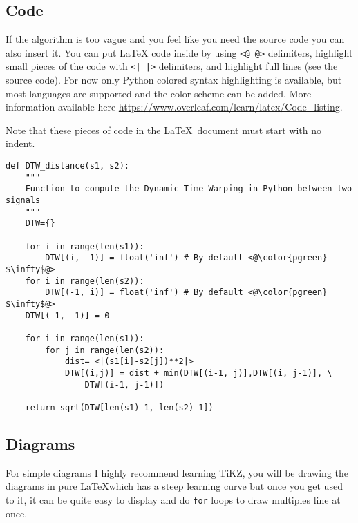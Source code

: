 \documentclass{project-logbook}
\begin{document}
	\subsection{Code} \label{sub:code}
		\begin{HighlightedNote}{}
			If the algorithm is too vague and you feel like you need the source code you can also insert it. You can put LaTeX code inside by using \texttt{<@ @>} delimiters, highlight small pieces of the code with \texttt{<| |>} delimiters, and highlight full lines (see the source code). For now only Python colored syntax highlighting is available, but most languages are supported and the color scheme can be added. More information available here \url{https://www.overleaf.com/learn/latex/Code_listing}.

			Note that these pieces of code in the \LaTeX~document must start with no indent.
		\end{HighlightedNote}

\begin{lstlisting}[style=Python, linebackgroundcolor={
	\ifnum \value{lstnumber}=8 \color{orange!30} \fi
	\ifnum \value{lstnumber}=10 \color{orange!30} \fi
	\ifnum \value{lstnumber}=17 \color{orange!30}\fi
	\ifnum \value{lstnumber}=18 \color{orange!30}\fi}]
def DTW_distance(s1, s2):
	"""
	Function to compute the Dynamic Time Warping in Python between two signals
	"""
	DTW={}

	for i in range(len(s1)):
		DTW[(i, -1)] = float('inf') # By default <@\color{pgreen} $\infty$@>
	for i in range(len(s2)):
		DTW[(-1, i)] = float('inf') # By default <@\color{pgreen} $\infty$@>
	DTW[(-1, -1)] = 0

	for i in range(len(s1)):
		for j in range(len(s2)):
			dist= <|(s1[i]-s2[j])**2|>
			DTW[(i,j)] = dist + min(DTW[(i-1, j)],DTW[(i, j-1)], \
				DTW[(i-1, j-1)])

	return sqrt(DTW[len(s1)-1, len(s2)-1])
\end{lstlisting}

	\subsection{Diagrams} \label{sub:diagrams}
		\begin{HighlightedNote}{}
			For simple diagrams I highly recommend learning TiKZ, you will be drawing the diagrams in pure \LaTeX which has a steep learning curve but once you get used to it, it can be quite easy to display and do \texttt{for} loops to draw multiples line at once.
		\end{HighlightedNote}
\end{document}
